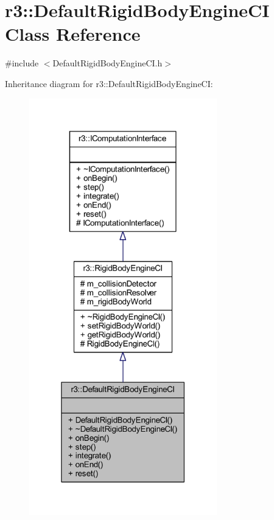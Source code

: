 \hypertarget{classr3_1_1_default_rigid_body_engine_c_i}{}\section{r3\+:\+:Default\+Rigid\+Body\+Engine\+CI Class Reference}
\label{classr3_1_1_default_rigid_body_engine_c_i}


{\ttfamily \#include $<$Default\+Rigid\+Body\+Engine\+C\+I.\+h$>$}



Inheritance diagram for r3\+:\+:Default\+Rigid\+Body\+Engine\+CI\+:\nopagebreak
\begin{figure}[H]
\begin{center}
\leavevmode
\includegraphics[width=231pt]{classr3_1_1_default_rigid_body_engine_c_i__inherit__graph}
\end{center}
\end{figure}


